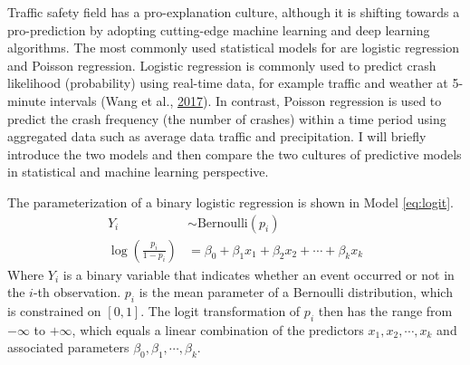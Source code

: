 \documentclass[12pt]{book}
\numberwithin{equation}{chapter}
\begin{document}
Traffic safety field has a pro-explanation culture, although it is shifting towards a pro-prediction by adopting cutting-edge machine learning and deep learning algorithms. The most commonly used statistical models for are logistic regression and Poisson regression. Logistic regression is commonly used to predict crash likelihood (probability) using real-time data, for example traffic and weather at 5-minute intervals (Wang et al., \protect\hyperlink{ref-wang2017safety}{2017}). In contrast, Poisson regression is used to predict the crash frequency (the number of crashes) within a time period using aggregated data such as average data traffic and precipitation. I will briefly introduce the two models and then compare the two cultures of predictive models in statistical and machine learning perspective.

The parameterization of a binary logistic regression is shown in Model \eqref{eq:logit}.
\begin{equation}
\begin{split}
Y_i & \sim \text{Bernoulli}(p_i) \\
\log(\frac{p_i}{1 - p_i}) & = \beta_0 + \beta_1x_1 + \beta_2x_2 + \cdots + \beta_kx_k
\label{eq:logit}
\end{split}
\end{equation}
Where \(Y_i\) is a binary variable that indicates whether an event occurred or not in the \(i\)-th observation. \(p_i\) is the mean parameter of a Bernoulli distribution, which is constrained on \([0, 1]\). The logit transformation of \(p_i\) then has the range from \(-\infty\) to \(+\infty\), which equals a linear combination of the predictors \(x_1, x_2, \cdots, x_k\) and associated parameters \(\beta_0, \beta_1, \cdots, \beta_k\).
\end{document}
